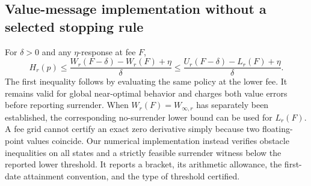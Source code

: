 \subsection{Value-message implementation without a selected stopping rule}
For $\delta>0$ and any $\eta$-response at fee $F$,
\begin{equation}
 H_r(p)\leq\frac{W_r(F-\delta)-W_r(F)+\eta}{\delta}
 \leq\frac{U_r(F-\delta)-L_r(F)+\eta}{\delta}.
 \label{eq:r19-query-exit}
\end{equation}
The first inequality follows by evaluating the same policy at the lower fee. It remains valid for global near-optimal behavior and charges both value errors before reporting surrender. When $W_r(F)=W_{\infty,r}$ has separately been established, the corresponding no-surrender lower bound can be used for $L_r(F)$. A fee grid cannot certify an exact zero derivative simply because two floating-point values coincide. Our numerical implementation instead verifies obstacle inequalities on all states and a strictly feasible surrender witness below the reported lower threshold. It reports a bracket, its arithmetic allowance, the first-date attainment convention, and the type of threshold certified.
